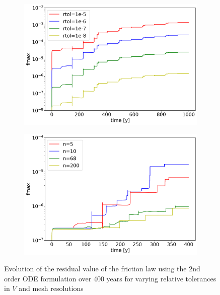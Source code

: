 \begin{figure}[H]
	\centering
	\begin{subfigure}{0.45\textwidth}
		\centering
		\includegraphics[width=1\textwidth]{images/TANDEMtimeEvolutionFExtendedODEDifferentTolerances.png}
		\label{fig:timeEvolution_2ndOrderODE_differentTolerances}
	\end{subfigure}
	\begin{subfigure}{0.45\textwidth}
		\centering
		\includegraphics[width=1\textwidth]{images/TANDEMtimeEvolutionFExtendedODEDifferentSizes.png}
		\label{fig:timeEvolution_2ndOrderODE_differentSizes}
	\end{subfigure}
	\label{fig:timeEvolution_2ndOrderODE}
	\caption{Evolution of the residual value of the friction law using the 2nd order ODE formulation over 400 years for varying relative tolerances in $V$ and mesh resolutions}
\end{figure}

